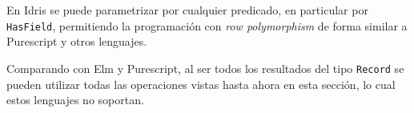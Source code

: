 En Idris se puede parametrizar por cualquier predicado, en particular por \texttt{HasField}, permitiendo la programación con \textit{row polymorphism} de forma similar a Purescript y otros lenguajes.

Comparando con Elm y Purescript, al ser todos los resultados del tipo \texttt{Record} se pueden utilizar todas las operaciones vistas hasta ahora en esta sección, lo cual estos lenguajes no soportan.
